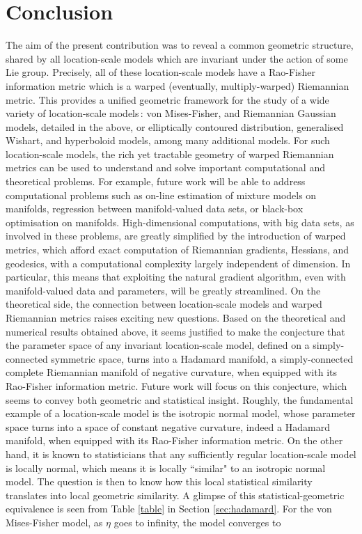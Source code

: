 \documentclass{svmult}
\begin{document}
\section*{Conclusion}
The aim of the present contribution was to reveal a common geometric structure, shared by all location-scale models which are invariant under the action of some Lie group. Precisely, all of these location-scale models have a Rao-Fisher information metric which is a warped (eventually, multiply-warped) Riemannian metric. This provides a unified geometric framework for the study of a wide variety of location-scale models\,: von Mises-Fisher, and Riemannian Gaussian models, detailed in the above, or elliptically contoured distribution, generalised Wishart, and hyperboloid models, among many additional models. For such location-scale models, the rich yet tractable geometry of warped Riemannian metrics can be used to understand and solve important computational and theoretical problems. For example, future work will be able to address computational problems such as on-line estimation of mixture models on manifolds, regression between manifold-valued data sets, or black-box optimisation on manifolds. High-dimensional computations, with big data sets, as involved in these problems, are greatly simplified by the introduction of warped metrics, which afford exact computation of Riemannian gradients, Hessians, and geodesics,  
with a computational complexity largely independent of dimension. In particular, this means that exploiting the natural gradient algorithm, even with manifold-valued data and parameters, will be greatly streamlined. On the theoretical side, the connection between location-scale models and warped Riemannian metrics raises exciting new questions. Based on the theoretical and numerical results obtained above, it seems justified to make the conjecture that the parameter space of any invariant location-scale model, defined on a simply-connected symmetric space, turns into a Hadamard manifold, a simply-connected complete Riemannian manifold of negative curvature, when equipped with its Rao-Fisher information metric. Future work will focus on this conjecture, which seems to convey both geometric and statistical insight. Roughly, the fundamental example of a location-scale model is the isotropic normal model, whose parameter space turns into a space of constant negative curvature, indeed a Hadamard manifold, when equipped with its Rao-Fisher information metric. On the other hand, it is known to statisticians that any sufficiently regular location-scale model is locally normal, which means it is locally ``similar" to an isotropic normal model. The question is then to know how this local statistical similarity translates into local geometric similarity. A glimpse of this statistical-geometric equivalence is seen from Table \ref{table} in Section \ref{sec:hadamard}. For the von Mises-Fisher model, as $\eta$ goes to infinity, the model converges to 
\end{document}
